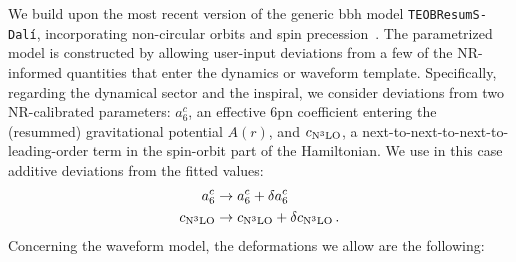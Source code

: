 \documentclass[prd,amssymb,amsmath,amsfonts,nofootinbib,reprint,showpacs,longbibliography]{revtex4-1}
\def\TEOBResumSDali{\texttt{TEOBResumS-Dalí}}
\def\c3{c_{\rm{N}^3\rm{LO}}}
\begin{document}
We build upon the most recent version of the generic \ac{bbh} model \TEOBResumSDali, incorporating non-circular
orbits and spin precession~\cite{Nagar:2024oyk, Gamba:2024cvy}. The parametrized model is constructed by
allowing user-input deviations from a few of the NR-informed quantities that enter the dynamics or waveform
template. Specifically, regarding the dynamical sector and the inspiral, we consider deviations from two
NR-calibrated parameters: $a_6^c$, an effective 6\ac{pn} coefficient entering the (resummed) gravitational
potential $A(r)$, and $c_{\rm{N}^3\rm{LO}}$, a next-to-next-to-next-to-leading-order term in the spin-orbit
part of the Hamiltonian. We use in this case additive deviations from the fitted values:
\begin{subequations}
\begin{align}
a_6^c &\rightarrow a_6^c + \delta a_6^c \\
\c3 &\rightarrow \c3 + \delta \c3 \, .
\end{align}
\end{subequations}
Concerning the waveform model, the deformations we allow are the following:
\end{document}
